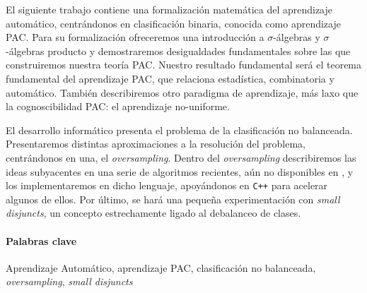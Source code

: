 El siguiente trabajo contiene una formalización matemática del aprendizaje automático, centrándonos en clasificación binaria,
conocida como aprendizaje PAC. Para su formalización ofreceremos una introducción a $\sigma$-álgebras y $\sigma$-álgebras producto y demostraremos desigualdades
fundamentales sobre las que construiremos nuestra teoría PAC. Nuestro resultado fundamental será el teorema fundamental del
aprendizaje PAC, que relaciona estadística, combinatoria y automático. También describiremos otro paradigma de aprendizaje,
más laxo que la cognoscibilidad PAC: el aprendizaje no-uniforme.

El desarrollo informático presenta el problema de la clasificación no balanceada. Presentaremos distintas aproximaciones 
a la resolución del problema, centrándonos en una, el \textit{oversampling}. Dentro del \textit{oversampling} describiremos
las ideas subyacentes en una serie de algoritmos recientes, aún no disponibles en \R, y los implementaremos en dicho 
lenguaje, apoyándonos en \texttt{C++} para acelerar algunos de ellos. Por último, se hará una pequeña experimentación
con \textit{small disjuncts}, un concepto estrechamente ligado al debalanceo de clases.

\paragraph{Palabras clave}
Aprendizaje Automático, aprendizaje PAC, clasificación no balanceada, \textit{oversampling}, \textit{small disjuncts}